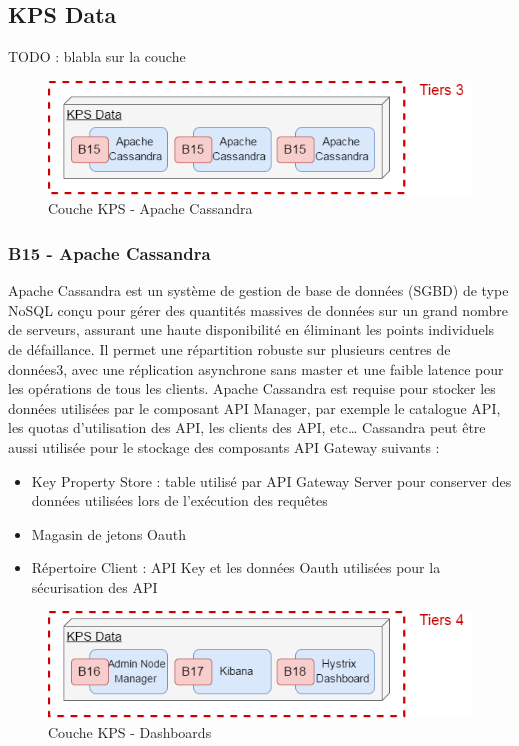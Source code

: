 \subsection{KPS Data}

	TODO : blabla sur la couche
	
\begin{figure}[H]
	\includegraphics[scale=0.5]{images/travailNeuflizeOBC/architecture/coucheCassandra.png}
	\centering
	\caption{Couche KPS - Apache Cassandra}
	\label{coucheCassandra}
\end{figure}
	
	\subsubsection{B15 - Apache Cassandra}
	Apache Cassandra est un système de gestion de base de données (SGBD) de type NoSQL conçu pour gérer des quantités massives de données sur un grand nombre de serveurs, assurant une haute disponibilité en éliminant les points individuels de défaillance. Il permet une répartition robuste sur plusieurs centres de données3, avec une réplication asynchrone sans master et une faible latence pour les opérations de tous les clients. 
Apache Cassandra est requise pour stocker les données utilisées par le composant API Manager, par exemple le catalogue API, les quotas d’utilisation des API, les clients des API, etc… Cassandra peut être aussi utilisée pour le stockage des composants API Gateway suivants : \\

\begin{itemize}
	\item Key Property Store : table utilisé par API Gateway Server pour conserver des données utilisées lors de l’exécution des requêtes
	\item Magasin de jetons Oauth
	\item Répertoire Client : API Key et les données Oauth utilisées pour la sécurisation des API \\
\end{itemize}

\begin{figure}[H]
	\includegraphics[scale=0.5]{images/travailNeuflizeOBC/architecture/coucheDashboard.png}
	\centering
	\caption{Couche KPS - Dashboards}
	\label{coucheDashboard}
\end{figure}
	
